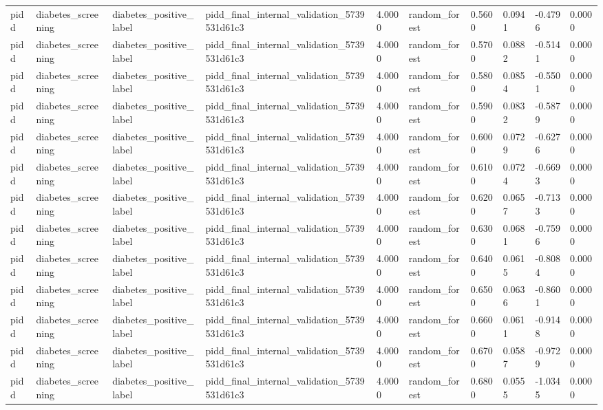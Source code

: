 \begin{tabular}{llllllllll}
pidd & diabetes\_screening & diabetes\_positive\_label & pidd\_final\_internal\_validation\_5739531d61c3 & 4.0000 & random\_forest & 0.5600 & 0.0941 & -0.4796 & 0.0000 \\
pidd & diabetes\_screening & diabetes\_positive\_label & pidd\_final\_internal\_validation\_5739531d61c3 & 4.0000 & random\_forest & 0.5700 & 0.0882 & -0.5141 & 0.0000 \\
pidd & diabetes\_screening & diabetes\_positive\_label & pidd\_final\_internal\_validation\_5739531d61c3 & 4.0000 & random\_forest & 0.5800 & 0.0854 & -0.5501 & 0.0000 \\
pidd & diabetes\_screening & diabetes\_positive\_label & pidd\_final\_internal\_validation\_5739531d61c3 & 4.0000 & random\_forest & 0.5900 & 0.0832 & -0.5879 & 0.0000 \\
pidd & diabetes\_screening & diabetes\_positive\_label & pidd\_final\_internal\_validation\_5739531d61c3 & 4.0000 & random\_forest & 0.6000 & 0.0729 & -0.6276 & 0.0000 \\
pidd & diabetes\_screening & diabetes\_positive\_label & pidd\_final\_internal\_validation\_5739531d61c3 & 4.0000 & random\_forest & 0.6100 & 0.0724 & -0.6693 & 0.0000 \\
pidd & diabetes\_screening & diabetes\_positive\_label & pidd\_final\_internal\_validation\_5739531d61c3 & 4.0000 & random\_forest & 0.6200 & 0.0657 & -0.7133 & 0.0000 \\
pidd & diabetes\_screening & diabetes\_positive\_label & pidd\_final\_internal\_validation\_5739531d61c3 & 4.0000 & random\_forest & 0.6300 & 0.0681 & -0.7596 & 0.0000 \\
pidd & diabetes\_screening & diabetes\_positive\_label & pidd\_final\_internal\_validation\_5739531d61c3 & 4.0000 & random\_forest & 0.6400 & 0.0615 & -0.8084 & 0.0000 \\
pidd & diabetes\_screening & diabetes\_positive\_label & pidd\_final\_internal\_validation\_5739531d61c3 & 4.0000 & random\_forest & 0.6500 & 0.0636 & -0.8601 & 0.0000 \\
pidd & diabetes\_screening & diabetes\_positive\_label & pidd\_final\_internal\_validation\_5739531d61c3 & 4.0000 & random\_forest & 0.6600 & 0.0611 & -0.9148 & 0.0000 \\
pidd & diabetes\_screening & diabetes\_positive\_label & pidd\_final\_internal\_validation\_5739531d61c3 & 4.0000 & random\_forest & 0.6700 & 0.0587 & -0.9729 & 0.0000 \\
pidd & diabetes\_screening & diabetes\_positive\_label & pidd\_final\_internal\_validation\_5739531d61c3 & 4.0000 & random\_forest & 0.6800 & 0.0555 & -1.0345 & 0.0000 \\

\end{tabular}

